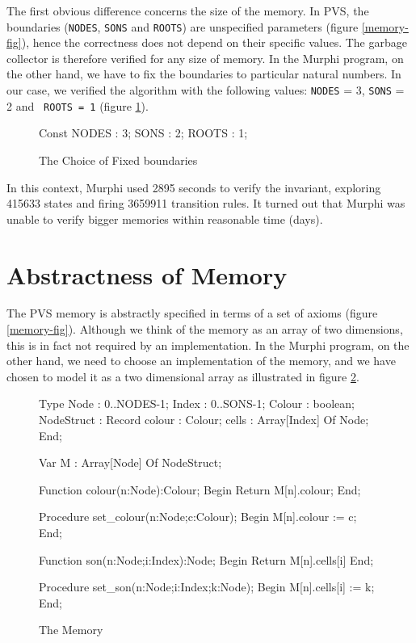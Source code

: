 The first obvious difference concerns the size of the memory.   In PVS,
the   boundaries  ({\tt  NODES},  {\tt  SONS}  and  {\tt  ROOTS})  are
unspecified    parameters   (figure   \ref{memory-fig}),   hence   the
correctness does not depend  on  their specific  values.  The  garbage
collector is therefore verified for any size of memory.  In the Murphi
program,  on  the  other hand, we  have to fix the boundaries to
particular natural numbers.  In  our case, we  verified  the algorithm
with the  following  values: {\tt NODES} = 3, {\tt SONS} =  2 and {\tt
ROOTS = 1} (figure \ref{murphi-bounds-fig}).

\begin{figure}
\begin{smallsession}
Const
  NODES : 3;
  SONS  : 2;
  ROOTS : 1;
\end{smallsession}
\caption{The Choice of Fixed boundaries}
\label{murphi-bounds-fig}
\end{figure}

In  this context, Murphi used  2895  seconds to verify  the invariant,
exploring 415633 states and firing 3659911 transition rules. It turned
out that Murphi was unable to verify bigger memories within reasonable
time (days).


\section*{Abstractness of Memory}

The PVS memory is abstractly specified in terms of a set of axioms
(figure  \ref{memory-fig}).
Although we think of the memory as an array of two dimensions, this is in
fact not required by an implementation. In the Murphi program, on the
other hand, we need to choose an implementation of the memory, and we have
chosen to model it as a two dimensional array as illustrated in figure
\ref{murphi-memory-fig}.

\begin{figure}
\begin{smallsession}
Type
  Node   : 0..NODES-1;
  Index  : 0..SONS-1;
  Colour : boolean;
  NodeStruct : Record
                 colour : Colour;
                 cells  : Array[Index] Of Node;
               End;

Var
  M : Array[Node] Of NodeStruct; 

Function colour(n:Node):Colour;
Begin
  Return M[n].colour;
End;

Procedure set_colour(n:Node;c:Colour);
Begin
  M[n].colour := c;
End;

Function son(n:Node;i:Index):Node;
Begin
  Return M[n].cells[i]
End;

Procedure set_son(n:Node;i:Index;k:Node);
Begin
  M[n].cells[i] := k;  
End;
\end{smallsession}
\caption{The Memory}
\label{murphi-memory-fig}
\end{figure}


